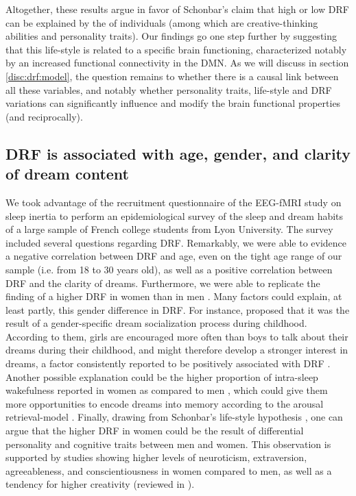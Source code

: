 Altogether, these results argue in favor of Schonbar's claim \citeyearpar{schonbar_differential_1965} that high or low DRF can be explained by the  of individuals (among which are creative-thinking abilities and personality traits). Our findings go one step further by suggesting that this life-style is related to a specific brain functioning, characterized notably by an increased functional connectivity in the DMN. As we will discuss in section \ref{disc:drf:model}, the question remains to whether there is a causal link between all these variables, and notably whether personality traits, life-style and DRF variations can significantly influence and modify the brain functional properties (and reciprocally).

\subsection{DRF is associated with age, gender, and clarity of dream content}
\label{disc:drf:summary:survey}

We took advantage of the recruitment questionnaire of the EEG-fMRI study on sleep inertia to perform an epidemiological survey of the sleep and dream habits of a large sample of French college students from Lyon University. The survey included several questions regarding DRF. Remarkably, we were able to evidence a negative correlation between DRF and age, even on the tight age range of our sample (i.e. from 18 to 30 years old), as well as a positive correlation between DRF and the clarity of dreams. Furthermore, we were able to replicate the finding of a higher DRF in women than in men \citep{schredl_gender_2008}. Many factors could explain, at least partly, this gender difference in DRF. For instance, \citet{schredl_gender_2008} proposed that it was the result of a gender-specific dream socialization process during childhood. According to them, girls are encouraged more often than boys to talk about their dreams during their childhood, and might therefore develop a stronger interest in dreams, a factor consistently reported to be positively associated with DRF \citep{schredl_factors_2003}. Another possible explanation could be the higher proportion of intra-sleep wakefulness reported in women as compared to men \citep{reyner_gender-and_1995}, which could give them more opportunities to encode dreams into memory according to the arousal retrieval-model \citep{koulack_dream_1976}. Finally, drawing from Schonbar's life-style hypothesis \citeyearpar{schonbar_differential_1965}, one can argue that the higher DRF in women could be the result of differential personality and cognitive traits between men and women. This observation is supported by studies showing higher levels of neuroticism, extraversion, agreeableness, and conscientiousness in women compared to men, as well as a tendency for higher creativity (reviewed in \citealp{schmitt_why_2009, baer_gender_2008}).

